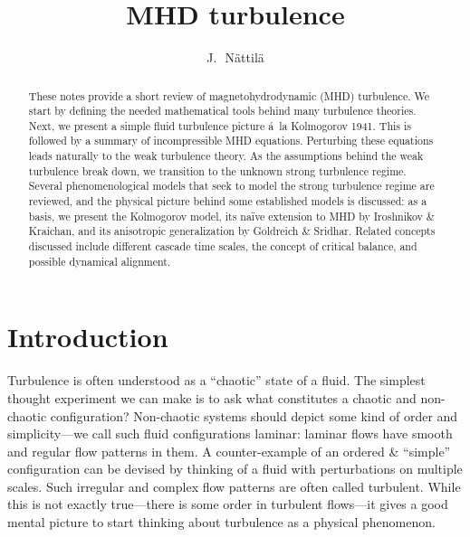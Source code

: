 \documentclass[usenatbib,twocolumn, twocolappendix]{aastex63}
\begin{document}
\title{MHD turbulence}

\author{J.~\,N\"attil\"a}



\begin{abstract}
    These notes provide a short review of magnetohydrodynamic (MHD) turbulence.
    We start by defining the needed mathematical tools behind many turbulence theories.
    Next, we present a simple fluid turbulence picture \'a~la Kolmogorov 1941.
    This is followed by a summary of incompressible MHD equations.
    Perturbing these equations leads naturally to the weak turbulence theory.
    As the assumptions behind the weak turbulence break down, we transition to the unknown strong turbulence regime.
    Several phenomenological models that seek to model the strong turbulence regime are reviewed, and the physical picture behind some established models is discussed:
    as a basis, we present the Kolmogorov model, its na\"ive extension to MHD by Iroshnikov \& Kraichan, and its anisotropic generalization by Goldreich \& Sridhar.
    Related concepts discussed include different cascade time scales, the concept of critical balance, and possible dynamical alignment.
\end{abstract}





\section{Introduction}

Turbulence is often understood as a ``chaotic'' state of a fluid.
The simplest thought experiment we can make is to ask what constitutes a chaotic and non-chaotic configuration?
Non-chaotic systems should depict some kind of order and simplicity---we call such fluid configurations laminar:
laminar flows have smooth and regular flow patterns in them.
A counter-example of an ordered \& ``simple'' configuration can be devised by thinking of a fluid with perturbations on multiple scales.
Such irregular and complex flow patterns are often called turbulent.
While this is not exactly true---there is some order in turbulent flows---it gives a good mental picture to start thinking about turbulence as a physical phenomenon.
\end{document}
